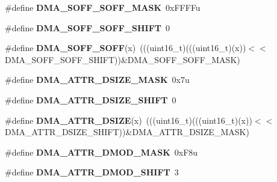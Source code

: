 \begin{DoxyCompactItemize}
\item 
\#define {\bfseries D\+M\+A\+\_\+\+S\+O\+F\+F\+\_\+\+S\+O\+F\+F\+\_\+\+M\+A\+SK}~0x\+F\+F\+F\+Fu\hypertarget{group__DMA__Register__Masks_ga2bca88a49fda82f9a61bb3d832a9c156}{}\label{group__DMA__Register__Masks_ga2bca88a49fda82f9a61bb3d832a9c156}

\item 
\#define {\bfseries D\+M\+A\+\_\+\+S\+O\+F\+F\+\_\+\+S\+O\+F\+F\+\_\+\+S\+H\+I\+FT}~0\hypertarget{group__DMA__Register__Masks_ga79f435a1aaf18a307644638b20599a9e}{}\label{group__DMA__Register__Masks_ga79f435a1aaf18a307644638b20599a9e}

\item 
\#define {\bfseries D\+M\+A\+\_\+\+S\+O\+F\+F\+\_\+\+S\+O\+FF}(x)~(((uint16\+\_\+t)(((uint16\+\_\+t)(x))$<$$<$D\+M\+A\+\_\+\+S\+O\+F\+F\+\_\+\+S\+O\+F\+F\+\_\+\+S\+H\+I\+FT))\&D\+M\+A\+\_\+\+S\+O\+F\+F\+\_\+\+S\+O\+F\+F\+\_\+\+M\+A\+SK)\hypertarget{group__DMA__Register__Masks_ga17c965464f8707b527e21600d136c450}{}\label{group__DMA__Register__Masks_ga17c965464f8707b527e21600d136c450}

\item 
\#define {\bfseries D\+M\+A\+\_\+\+A\+T\+T\+R\+\_\+\+D\+S\+I\+Z\+E\+\_\+\+M\+A\+SK}~0x7u\hypertarget{group__DMA__Register__Masks_ga2093ce5434ffef34988c7e74999edbee}{}\label{group__DMA__Register__Masks_ga2093ce5434ffef34988c7e74999edbee}

\item 
\#define {\bfseries D\+M\+A\+\_\+\+A\+T\+T\+R\+\_\+\+D\+S\+I\+Z\+E\+\_\+\+S\+H\+I\+FT}~0\hypertarget{group__DMA__Register__Masks_ga24d7778d89bba4e048649cfa85bbc2d3}{}\label{group__DMA__Register__Masks_ga24d7778d89bba4e048649cfa85bbc2d3}

\item 
\#define {\bfseries D\+M\+A\+\_\+\+A\+T\+T\+R\+\_\+\+D\+S\+I\+ZE}(x)~(((uint16\+\_\+t)(((uint16\+\_\+t)(x))$<$$<$D\+M\+A\+\_\+\+A\+T\+T\+R\+\_\+\+D\+S\+I\+Z\+E\+\_\+\+S\+H\+I\+FT))\&D\+M\+A\+\_\+\+A\+T\+T\+R\+\_\+\+D\+S\+I\+Z\+E\+\_\+\+M\+A\+SK)\hypertarget{group__DMA__Register__Masks_ga6f2bffdadee81034ea85759111dfc711}{}\label{group__DMA__Register__Masks_ga6f2bffdadee81034ea85759111dfc711}

\item 
\#define {\bfseries D\+M\+A\+\_\+\+A\+T\+T\+R\+\_\+\+D\+M\+O\+D\+\_\+\+M\+A\+SK}~0x\+F8u\hypertarget{group__DMA__Register__Masks_gaaa09f9ea822cc0cfe20270611cf522cc}{}\label{group__DMA__Register__Masks_gaaa09f9ea822cc0cfe20270611cf522cc}

\item 
\#define {\bfseries D\+M\+A\+\_\+\+A\+T\+T\+R\+\_\+\+D\+M\+O\+D\+\_\+\+S\+H\+I\+FT}~3\hypertarget{group__DMA__Register__Masks_gab9f08d507f579493d605780d854404d6}{}\label{group__DMA__Register__Masks_gab9f08d507f579493d605780d854404d6}


\end{DoxyCompactItemize}
